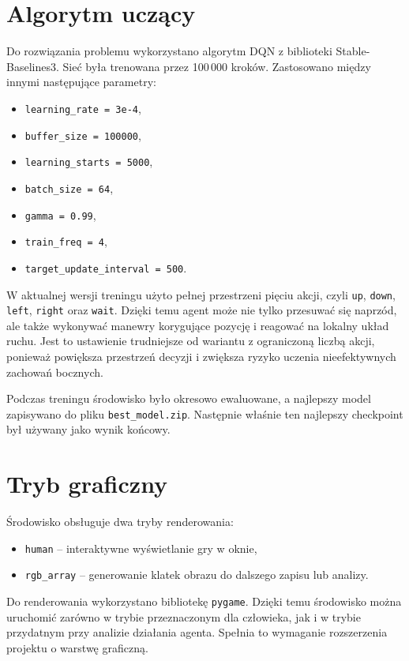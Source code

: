\documentclass[12pt,a4paper]{article}
\begin{document}
\section{Algorytm uczący}
Do rozwiązania problemu wykorzystano algorytm DQN z biblioteki Stable-Baselines3. Sieć była trenowana przez 100\,000 kroków. Zastosowano między innymi następujące parametry:
\begin{itemize}
    \item \texttt{learning\_rate = 3e-4},
    \item \texttt{buffer\_size = 100000},
    \item \texttt{learning\_starts = 5000},
    \item \texttt{batch\_size = 64},
    \item \texttt{gamma = 0.99},
    \item \texttt{train\_freq = 4},
    \item \texttt{target\_update\_interval = 500}.
\end{itemize}

W aktualnej wersji treningu użyto pełnej przestrzeni pięciu akcji, czyli \texttt{up}, \texttt{down}, \texttt{left}, \texttt{right} oraz \texttt{wait}. Dzięki temu agent może nie tylko przesuwać się naprzód, ale także wykonywać manewry korygujące pozycję i reagować na lokalny układ ruchu. Jest to ustawienie trudniejsze od wariantu z ograniczoną liczbą akcji, ponieważ powiększa przestrzeń decyzji i zwiększa ryzyko uczenia nieefektywnych zachowań bocznych.

Podczas treningu środowisko było okresowo ewaluowane, a najlepszy model zapisywano do pliku \texttt{best\_model.zip}. Następnie właśnie ten najlepszy checkpoint był używany jako wynik końcowy.

\section{Tryb graficzny}
Środowisko obsługuje dwa tryby renderowania:
\begin{itemize}
    \item \texttt{human} -- interaktywne wyświetlanie gry w oknie,
    \item \texttt{rgb\_array} -- generowanie klatek obrazu do dalszego zapisu lub analizy.
\end{itemize}

Do renderowania wykorzystano bibliotekę \texttt{pygame}. Dzięki temu środowisko można uruchomić zarówno w trybie przeznaczonym dla człowieka, jak i w trybie przydatnym przy analizie działania agenta. Spełnia to wymaganie rozszerzenia projektu o warstwę graficzną.
\end{document}
